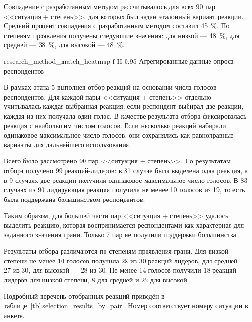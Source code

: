		Совпадение с разработанным методом рассчитывалось для всех 90 пар <<ситуация + степень>>, для которых был задан эталонный вариант реакции.
		Средний процент совпадения с разработанным методом составил 45~\%.
		По степеням проявления получены следующие значения: для низкой --- 48~\%, для средней --- 38~\%, для высокой --- 48~\%.

		{research_method_match_heatmap}
		{f}
		{H}
		{0.95\textwidth}
		{Агрегированные данные опроса респондентов}

В рамках этапа 5 выполнен отбор реакций на основании числа голосов
	респондентов.
	Для каждой пары <<ситуация + степень>> отдельно учитывалась каждая
	выбранная реакция: если респондент выбирал две реакции, каждая из них
	получала один голос.
	В качестве результата отбора фиксировалась реакция с наибольшим числом
	голосов.
	Если несколько реакций набирали одинаковое максимальное число голосов,
	они сохранялись как равноправные варианты для дальнейшего использования.

	Всего было рассмотрено 90 пар <<ситуация + степень>>.
	По результатам отбора получено 99 реакций-лидеров: в 81 случае была
	выделена одна реакция, а в 9 случаях две реакции получили одинаковое
	максимальное число голосов.
	В 83 случаях из 90 лидирующая реакция получила не менее 10 голосов из 19,
	то есть была поддержана большинством респондентов.

	Таким образом, для большей части пар <<ситуация + степень>> удалось
	выделить реакцию, которая воспринимается респондентами как характерная
	для заданного значения грани.
	Только 7 пар не получили поддержки большинства.

	Результаты отбора различаются по степеням проявления грани.
	Для низкой степени не менее 10 голосов получила 28 из 30 реакций-лидеров,
	для средней --- 27 из 30, для высокой --- 28 из 30.
	Не менее 14 голосов получили 18 реакций-лидеров для низкой степени, 8
	для средней и 22 для высокой.

	Подробный перечень отобранных реакций приведён в таблице~\ref{tbl:selection_results_by_pair}.
	Номер соответствует номеру ситуации в анкете.

